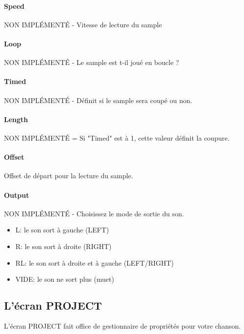 \documentclass[12pt,a4paper]{article}
\begin{document}
        \paragraph{Speed} NON IMPLÉMENTÉ - Vitesse de lecture du sample

        \paragraph{Loop} NON IMPLÉMENTÉ - Le sample est t-il joué en boucle ?

        \paragraph{Timed} NON IMPLÉMENTÉ - Définit si le sample sera coupé ou non.

        \paragraph{Length} NON IMPLÉMENTÉ = Si "Timed" est à 1, cette valeur définit la coupure.

        \paragraph{Offset} Offset de départ pour la lecture du sample.

        \paragraph{Output} NON IMPLÉMENTÉ - Choisissez le mode de sortie du son.
        \begin{itemize}
            \item{L: le son sort à gauche (LEFT)}
            \item{R: le son sort à droite (RIGHT)}
            \item{RL: le son sort à droite et à gauche (LEFT/RIGHT)}
            \item{VIDE: le son ne sort plus (muet)}
        \end{itemize}
    
    \subsection{L'écran PROJECT}
    
    L'écran PROJECT fait office de gestionnaire de propriétés pour votre chanson. 
    
\end{document}
